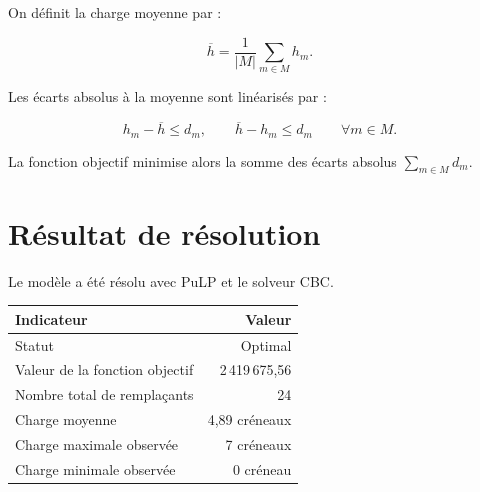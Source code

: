 \documentclass[11pt,a4paper]{article}
\begin{document}
On définit la charge moyenne par :

\[
\overline{h} = \frac{1}{|M|}\sum_{m\in M}h_m.
\]

Les écarts absolus à la moyenne sont linéarisés par :

\[
h_m-\overline{h} \leq d_m,\qquad
\overline{h}-h_m \leq d_m
\qquad \forall m\in M.
\]

La fonction objectif minimise alors la somme des écarts absolus
$\sum_{m\in M}d_m$.

\section{Résultat de résolution}

Le modèle a été résolu avec PuLP et le solveur CBC.

\begin{center}
\begin{tabular}{lr}
\toprule
\textbf{Indicateur} & \textbf{Valeur}\\
\midrule
Statut & Optimal\\
Valeur de la fonction objectif & 2\,419\,675{,}56\\
Nombre total de remplaçants & 24\\
Charge moyenne & 4,89 créneaux\\
Charge maximale observée & 7 créneaux\\
Charge minimale observée & 0 créneau\\
\bottomrule
\end{tabular}
\end{center}
\end{document}
